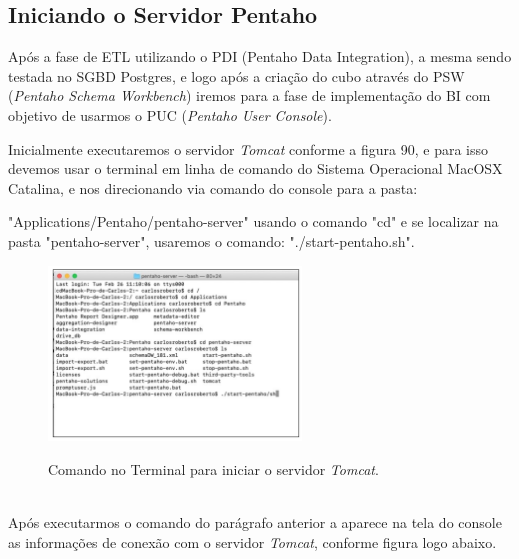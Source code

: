 \subsection{Iniciando o Servidor Pentaho}

Ap\'os a fase de ETL utilizando o PDI (Pentaho Data Integration), a mesma sendo testada no SGBD Postgres, e logo ap\'os a cria\c{c}\~{a}o do cubo atrav\'{e}s do PSW (\textit{Pentaho Schema Workbench}) iremos para a fase de implementa\c{c}\~{a}o do BI com objetivo de usarmos o PUC (\textit{Pentaho User Console}).

Inicialmente executaremos o servidor \textit{Tomcat} conforme a figura 90, e para isso devemos usar o terminal em linha de comando do Sistema Operacional MacOSX Catalina, e nos direcionando via comando do console para a pasta:

"Applications/Pentaho/pentaho-server" usando o comando "cd" e se localizar na pasta "pentaho-server", usaremos o comando: "./start-pentaho.sh".

\begin{figure}[H]
	\vspace*{0,2cm}
    \centering
    \caption{Comando no Terminal para iniciar o servidor \textit{Tomcat}.}
    \includegraphics[width=0.6\textwidth]{./04-figuras/figura-pserver}
    \label{fig:ilustfigpserver}
\end{figure}
\vspace*{-0,9cm}
{\raggedright {}} \\

Ap\'os executarmos o comando do par\'{a}grafo anterior a aparece na tela do console as informa\c{c}\~{o}es de conex\~{a}o com o servidor \textit{Tomcat}, conforme figura logo abaixo.

